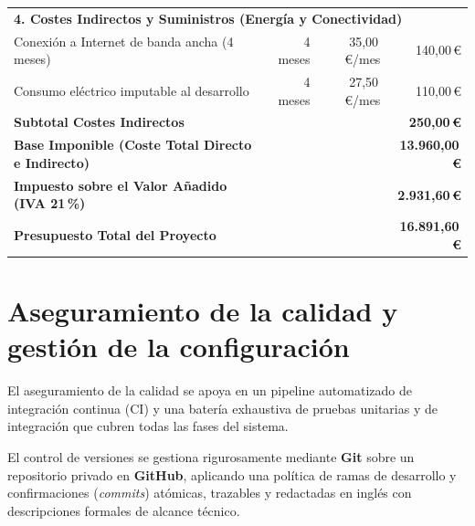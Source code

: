 \begin{table}[htbp]
{\begin{tabular}{p{7.6cm} r r r}
\midrule
\multicolumn{4}{l}{\textbf{4. Costes Indirectos y Suministros (Energía y Conectividad)}} \\
\quad Conexión a Internet de banda ancha (4 meses) & 4 meses & 35,00\,\euro/mes & 140,00\,\euro \\
\quad Consumo eléctrico imputable al desarrollo & 4 meses & 27,50\,\euro/mes & 110,00\,\euro \\
\textbf{Subtotal Costes Indirectos} & & & \textbf{250,00\,\euro} \\
\midrule
\textbf{Base Imponible (Coste Total Directo e Indirecto)} & & & \textbf{13.960,00\,\euro} \\
\textbf{Impuesto sobre el Valor Añadido (IVA 21\,\%)} & & & \textbf{2.931,60\,\euro} \\
\midrule
\textbf{Presupuesto Total del Proyecto} & & & \textbf{16.891,60\,\euro} \\
\bottomrule
\end{tabular}%
}
\end{table}

\section{Aseguramiento de la calidad y gestión de la configuración}
El aseguramiento de la calidad se apoya en un pipeline automatizado de integración continua (CI) y una batería exhaustiva de pruebas unitarias y de integración que cubren todas las fases del sistema.

El control de versiones se gestiona rigurosamente mediante \textbf{Git} sobre un repositorio privado en \textbf{GitHub}, aplicando una política de ramas de desarrollo y confirmaciones (\emph{commits}) atómicas, trazables y redactadas en inglés con descripciones formales de alcance técnico.

